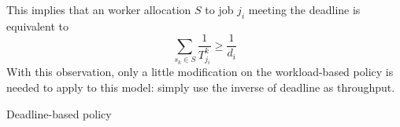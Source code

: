 This implies that an worker allocation $S$ to job $j_i$ meeting the
deadline is equivalent to
\[\displaystyle\sum_{s_k \in S}\frac{1}{T^k_{j_i}} \geq \frac{1}{d_i}\]
With this observation, only a little modification on the workload-based
policy is needed to apply to this model: simply use the inverse of
deadline as throughput.

\begin{algorithm}[]
  
  \caption{Deadline-based policy}
  \label{algo:deadline-based}
\end{algorithm}
